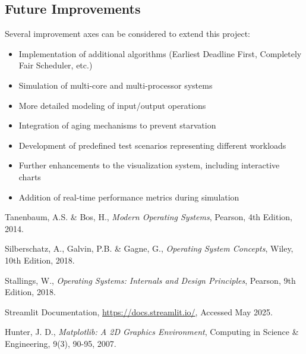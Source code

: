 \documentclass[12pt,a4paper]{article}
\begin{document}
\subsection{Future Improvements}
Several improvement axes can be considered to extend this project:
\begin{itemize}
    \item Implementation of additional algorithms (Earliest Deadline First, Completely Fair Scheduler, etc.)
    \item Simulation of multi-core and multi-processor systems
    \item More detailed modeling of input/output operations
    \item Integration of aging mechanisms to prevent starvation
    \item Development of predefined test scenarios representing different workloads
    \item Further enhancements to the visualization system, including interactive charts
    \item Addition of real-time performance metrics during simulation
\end{itemize}


\begin{thebibliography}{9}

  Tanenbaum, A.S. \& Bos, H.,
  \textit{Modern Operating Systems},
  Pearson, 4th Edition, 2014.

  Silberschatz, A., Galvin, P.B. \& Gagne, G.,
  \textit{Operating System Concepts},
  Wiley, 10th Edition, 2018.

  Stallings, W.,
  \textit{Operating Systems: Internals and Design Principles},
  Pearson, 9th Edition, 2018.

  Streamlit Documentation,
  \url{https://docs.streamlit.io/},
  Accessed May 2025.

  Hunter, J. D.,
  \textit{Matplotlib: A 2D Graphics Environment},
  Computing in Science \& Engineering, 9(3), 90-95, 2007.

\end{thebibliography}
\end{document}
